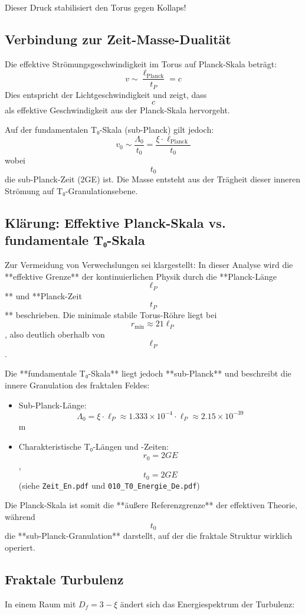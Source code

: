 \documentclass[12pt,a4paper]{article}
\begin{document}
	Dieser Druck stabilisiert den Torus gegen Kollaps!

	\subsection{Verbindung zur Zeit-Masse-Dualität}
	Die effektive Strömungsgeschwindigkeit im Torus auf Planck-Skala beträgt:
	$$   
	v \sim \frac{\ell_{\text{Planck}}}{t_P} = c
	$$
	Dies entspricht der Lichtgeschwindigkeit und zeigt, dass $$   c   $$ als effektive Geschwindigkeit aus der Planck-Skala hervorgeht.
	
	Auf der fundamentalen T₀-Skala (sub-Planck) gilt jedoch:
	$$   
	v_0 \sim \frac{\Lambda_0}{t_0} = \frac{\xi \cdot \ell_{\text{Planck}}}{t_0}
	$$
	wobei $$   t_0   $$ die sub-Planck-Zeit (2GE) ist. Die Masse entsteht aus der Trägheit dieser inneren Strömung auf T₀-Granulationsebene.
	
	\subsection{Klärung: Effektive Planck-Skala vs. fundamentale T₀-Skala}
	Zur Vermeidung von Verwechslungen sei klargestellt: In dieser Analyse wird die **effektive Grenze** der kontinuierlichen Physik durch die **Planck-Länge $$   \ell_P   $$** und **Planck-Zeit $$   t_P   $$** beschrieben. Die minimale stabile Torus-Röhre liegt bei $$   r_{\min} \approx 21 \ell_P   $$, also deutlich oberhalb von $$   \ell_P   $$.
	
	Die **fundamentale T₀-Skala** liegt jedoch **sub-Planck** und beschreibt die innere Granulation des fraktalen Feldes:
	\begin{itemize}
		\item Sub-Planck-Länge: $$   \Lambda_0 = \xi \cdot \ell_P \approx 1.333 \times 10^{-4} \cdot \ell_P \approx 2.15 \times 10^{-39}   $$ m
		\item Charakteristische T₀-Längen und -Zeiten: $$   r_0 = 2GE   $$, $$   t_0 = 2GE   $$ (siehe \texttt{Zeit\_En.pdf} und \texttt{010\_T0\_Energie\_De.pdf})
	\end{itemize}
	
	Die Planck-Skala ist somit die **äußere Referenzgrenze** der effektiven Theorie, während $$   t_0   $$ die **sub-Planck-Granulation** darstellt, auf der die fraktale Struktur wirklich operiert.
	
	\subsection{Fraktale Turbulenz}
	In einem Raum mit \( D_f = 3 - \xi \) ändert sich das Energiespektrum der Turbulenz:
	
\end{document}
